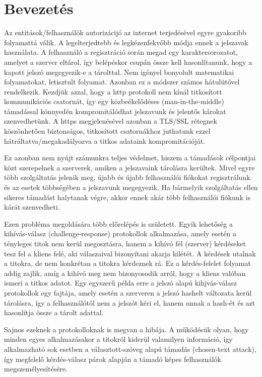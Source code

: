 \chapter{Bevezetés}

Az entitások/felhasználók autorizácijó az internet terjedésével egyre gyakoribb folyamattá válik. A legelterjedtebb és legkézenfekvőbb módja ennek a jelszavak használata. A felhasználó a regisztráció során megad egy karaktersorozatot, amelyet a szerver eltárol, így belépéskor csupán össze kell hasonlítanunk, hogy a kapott jelszó megegyezik-e a tárolttal. Nem igényel bonyolult matematikai folyamatokat, letisztult folyamat. Azonban ez a módszer számos hátulütővel rendelkezik. Kezdjük azzal, hogy a http protokoll nem kínál titkosított kommunikációs csatornát, így egy közbeékelődéses (man-in-the-middle) támadással könnyedén kompromitálódhat jelszavunk és jelentős károkat szenvedhetünk. A https megjelenésével azonban a TLS/SSL rétegnek köszönhetően biztonságos, titkosított csatornákhoz juthatunk ezzel hátráltatva/megakadályozva a titkos adataink kompromitációját.

Ez azonban nem nyújt számunkra teljes védelmet, hiszem a támadások célpontjai közt szerepelnek a szerverek, amiken a jelszavaink tárolásra kerültek. Mivel egyre több szolgáltatás jelenik meg, újabb és újabb felhasználói fiókokat regisztrálunk és az esetek többségében a jelszavunk megegyezik. Ha bármelyik szolgáltatás ellen sikeres támadást halytanak végre, akkor ennek akár több felhasználói fiókunk is kárát szenvedheti.

Ezen probléma megoldására több előrelépés is született. Egyik lehetőség a kihívás-válasz (challenge-response) protokollok alkalmazása, amely esetén a tényleges titok nem kerül megosztásra, hanem a kihívó fél (szerver) kérdéseket tesz fel a kliens felé, aki válaszaival bizonyítani akarja kilétét. A kérdések utalnak a titokra, de nem konkrétan a titokra kérdeznek rá. Ez a kérdés-felelet folyamat addig zajlik, amíg a kihívó meg nem bizonyosodik arról, hogy a kliens valóban ismeri a titkos adatot. Egy egyszerű példa erre a jelszó alapú kihjvás-válasz protokollok egy fajtája, amely esetén a szerveren a jelszó hashelt változata kerül tárolásra, így a felhasználótól nem a jelszót kéri el, hanem annak a hash-ét és azt hasonlítja össze a tárolt adattal.

Sajnos ezeknek a protokolloknak is megvan a hibája. A működésük olyan, hogy minden egyes alkalmazásakor a titokról kiderül valamilyen információ, így alkalmazható sok esetben a választott-szöveg alapú támadás (chosen-text attack), így megfelelő kérdés-válasz párok alapján a támadó képes felhasználók megszemélyesítésére.


